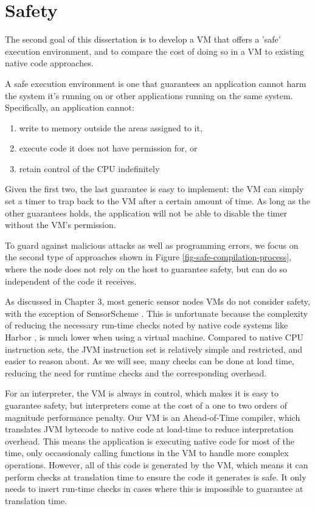 \chapter{Safety}
\label{sec-safety}


The second goal of this dissertation is to develop a VM that offers a 'safe' execution environment, and to compare the cost of doing so in a VM to existing native code approaches.

A safe execution environment is one that guarantees an application cannot harm the system it's running on or other applications running on the same system. Specifically, an application cannot:
\begin{enumerate}
	\item write to memory outside the areas assigned to it,
	\item execute code it does not have permission for, or
	\item retain control of the CPU indefinitely
\end{enumerate}

Given the first two, the last guarantee is easy to implement: the VM can simply set a timer to trap back to the VM after a certain amount of time. As long as the other guarantees holds, the application will not be able to disable the timer without the VM's permission.

To guard against malicious attacks as well as programming errors, we focus on the second type of approaches shown in Figure \ref{fig-safe-compilation-process}, where the node does not rely on the host to guarantee safety, but can do so independent of the code it receives.

As discussed in Chapter 3, most generic sensor nodes VMs do not consider safety, with the exception of SensorScheme \cite{Evers:2010ur}. This is unfortunate because the complexity of reducing the necessary run-time checks noted by native code systems like Harbor \cite{Kumar:2007ge}, is much lower when using a virtual machine. Compared to native CPU instruction sets, the JVM instruction set is relatively simple and restricted, and easier to reason about. As we will see, many checks can be done at load time, reducing the need for runtime checks and the corresponding overhead.

For an interpreter, the VM is always in control, which makes it is easy to guarantee safety, but interpreters come at the cost of a one to two orders of magnitude performance penalty. Our VM is an Ahead-of-Time compiler, which translates JVM bytecode to native code at load-time to reduce interpretation overhead. This means the application is executing native code for most of the time, only occassionaly calling functions in the VM to handle more complex operations. However, all of this code is generated by the VM, which means it can perform checks at translation time to ensure the code it generates is safe. It only needs to insert run-time checks in cases where this is impossible to guarantee at translation time.

